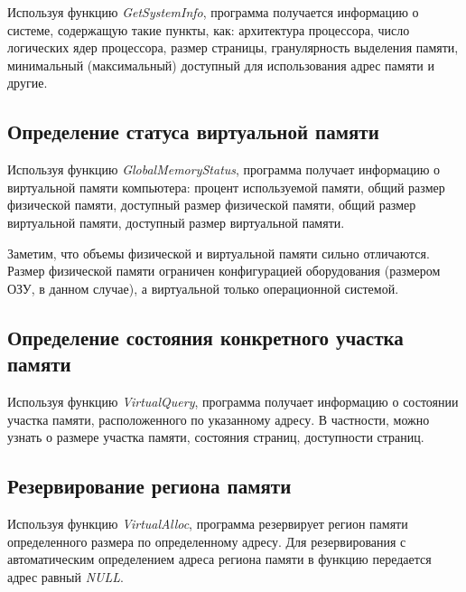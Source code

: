 \documentclass[a4paper,14pt]{extarticle}
\newcommand{\Code}[1]{\textit{#1}}
\begin{document}
Используя функцию \Code{GetSystemInfo}, программа получается информацию о
системе, содержащую такие пункты, как: архитектура процессора, число логических
ядер процессора, размер страницы, гранулярность выделения памяти, минимальный
(максимальный) доступный для использования адрес памяти и другие.



\subsection{Определение статуса виртуальной памяти}

Используя функцию \Code{GlobalMemoryStatus}, программа получает информацию о
виртуальной памяти компьютера: процент используемой памяти, общий размер
физической памяти, доступный размер физической памяти, общий размер виртуальной
памяти, доступный размер виртуальной памяти.

Заметим, что объемы физической и виртуальной памяти сильно отличаются. Размер
физической памяти ограничен конфигурацией оборудования (размером ОЗУ, в данном
случае), а виртуальной только операционной системой.



\subsection{Определение состояния конкретного участка памяти}

Используя функцию \Code{VirtualQuery}, программа получает информацию о
состоянии участка памяти, расположенного по указанному адресу. В частности,
можно узнать о размере участка памяти, состояния страниц, доступности страниц.



\subsection{Резервирование региона памяти}

Используя функцию \Code{VirtualAlloc}, программа резервирует регион памяти
определенного размера по определенному адресу. Для резервирования с
автоматическим определением адреса региона памяти в функцию передается адрес
равный \Code{NULL}.
\end{document}
